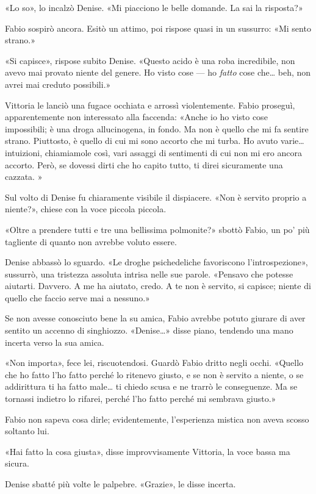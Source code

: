 «Lo so», lo incalzò Denise. «Mi piacciono le belle domande. La sai la risposta?»

Fabio sospirò ancora. Esitò un attimo, poi rispose quasi in un sussurro: «Mi sento strano.»

«Si capisce», rispose subito Denise. «Questo acido è una roba incredibile, non avevo mai provato niente del genere. Ho visto cose --- ho \emph{fatto} cose che\ldots{} beh, non avrei mai creduto possibili.»

Vittoria le lanciò una fugace occhiata e arrossì violentemente. Fabio proseguì, apparentemente non interessato alla faccenda: «Anche io ho visto cose impossibili; è una droga allucinogena, in fondo. Ma non è quello che mi fa sentire strano. Piuttosto, è quello di cui mi sono accorto che mi turba. Ho avuto varie\ldots{} intuizioni, chiamiamole così, vari assaggi di sentimenti di cui non mi ero ancora accorto. Però, se dovessi dirti che ho capito tutto, ti direi sicuramente una cazzata. »

Sul volto di Denise fu chiaramente visibile il dispiacere. «Non è servito proprio a niente?», chiese con la voce piccola piccola. 

«Oltre a prendere tutti e tre una bellissima polmonite?» sbottò Fabio, un po' più tagliente di quanto non avrebbe voluto essere.

Denise abbassò lo sguardo. «Le droghe psichedeliche favoriscono l'introspezione», sussurrò, una tristezza assoluta intrisa nelle sue parole. «Pensavo che potesse aiutarti. Davvero. A me ha aiutato, credo. A te non è servito, si capisce; niente di quello che faccio serve mai a nessuno.»

Se non avesse conosciuto bene la su amica, Fabio avrebbe potuto giurare di aver sentito un accenno di singhiozzo. «Denise\ldots{}» disse piano, tendendo una mano incerta verso la sua amica.

«Non importa», fece lei, riscuotendosi. Guardò Fabio dritto negli occhi. «Quello che ho fatto l'ho fatto perché lo ritenevo giusto, e se non è servito a niente, o se addirittura ti ha fatto male\ldots{} ti chiedo scusa e ne trarrò le conseguenze. Ma se tornassi indietro lo rifarei, perché l'ho fatto perché mi sembrava giusto.»

Fabio non sapeva cosa dirle; evidentemente, l'esperienza mistica non aveva scosso soltanto lui.

«Hai fatto la cosa giusta», disse improvvisamente Vittoria, la voce bassa ma sicura.

Denise sbatté più volte le palpebre. «Grazie», le disse incerta. 

